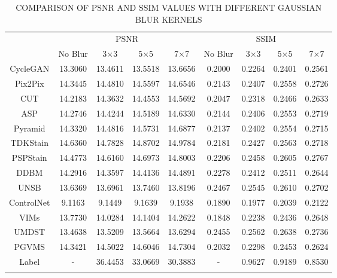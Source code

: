 \documentclass[journal,twoside,web]{ieeecolor}
\begin{document}
\begin{table}[h!]
\centering
\setlength\tabcolsep{1pt}
\caption{{COMPARISON OF PSNR AND SSIM VALUES WITH DIFFERENT GAUSSIAN BLUR KERNELS}}
\label{tab:combined_psnrssim_results}
\begin{tabular}{c|cccc|cccc}
\Xhline{1.5pt} 
\multirow{2}{*}{Method} & \multicolumn{4}{c|}{{PSNR}} & \multicolumn{4}{c}{{SSIM}} \\
\cline{2-9}
 & {No Blur} & {3×3} & {5×5} & {7×7} & {No Blur} & {3×3} & {5×5} & {7×7} \\
\hline
CycleGAN & 13.3060 & 13.4611 & 13.5518 & 13.6656 & 0.2000 & 0.2264 & 0.2401 & 0.2561 \\
Pix2Pix & 14.3445 & 14.4810 & 14.5597 & 14.6546 & 0.2143 & 0.2407 & 0.2558 & 0.2726 \\
CUT & 14.2183 & 14.3632 & 14.4553 & 14.5692 & 0.2047 & 0.2318 & 0.2466 & 0.2633 \\
ASP & 14.2746 & 14.4244 & 14.5189 & 14.6330 & 0.2144 & 0.2406 & 0.2553 & 0.2719 \\
Pyramid & 14.3320 & 14.4816 & 14.5731 & 14.6877 & 0.2137 & 0.2402 & 0.2554 & 0.2715 \\
TDKStain & 14.6360 & 14.7828 & 14.8702 & 14.9784 & 0.2181 & 0.2427 & 0.2563 & 0.2718 \\
PSPStain & 14.4773 & 14.6160 & 14.6973 & 14.8003 & 0.2206 & 0.2458 & 0.2605 & 0.2767 \\
DDBM & 14.2916 &14.3597 &14.4136 &14.4891 &0.2278 &0.2412 & 0.2511&0.2644\\
UNSB & 13.6369 &13.6961 &13.7460 &13.8196&0.2467 &0.2545 &0.2610&0.2702\\
ControlNet &9.1163 &9.1449 &9.1639 &9.1938 &0.1890 &0.1977 &0.2039 &0.2122\\
VIMs &13.7730 &14.0284&14.1404&14.2622&0.1848&0.2238&0.2436&0.2648\\
UMDST &13.4638 &13.5209&13.5664&13.6294&0.2455&0.2562&0.2638&0.2736\\

PGVMS & 14.3421 & 14.5022 & 14.6046 & 14.7304 & 0.2032 & 0.2298 & 0.2453 & 0.2624 \\
\hline
Label & - & 36.4453 & 33.0669 & 30.3883 & - & 0.9627 & 0.9189 & 0.8530 \\
\Xhline{1.5pt} 
\end{tabular}
\end{table}

\end{document}
